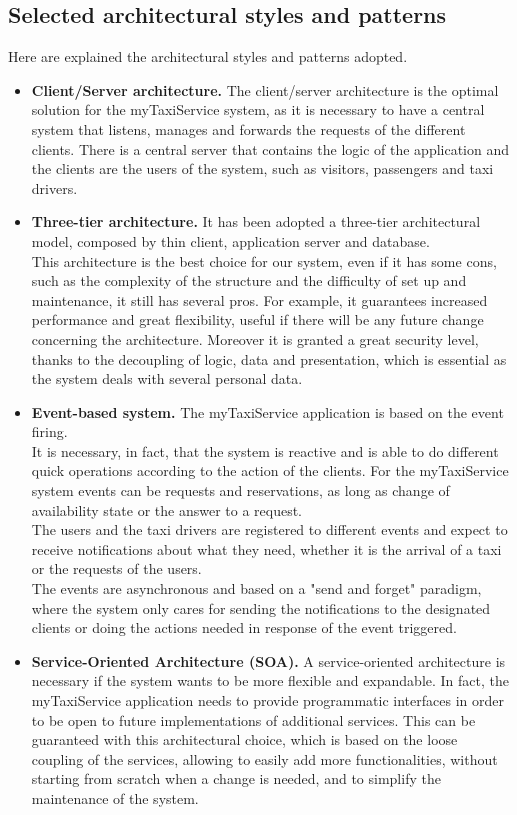 		\subsection{Selected architectural styles and patterns}
		Here are explained the architectural styles and patterns adopted.
		\begin{itemize}
			\item \textbf{Client/Server architecture.} The client/server architecture is the optimal solution for the myTaxiService system, as it is necessary to have a central system that listens, manages and forwards the requests of the different clients. There is a central server that contains the logic of the application and the clients are the users of the system, such as visitors, passengers and taxi drivers.
			\item \textbf{Three-tier architecture.} It has been adopted a three-tier architectural model, composed by thin client, application server and database.\\ This architecture is the best choice for our system, even if it has some cons, such as the complexity of the structure and the difficulty of set up and maintenance, it still has several pros. For example, it guarantees increased performance and great flexibility, useful if there will be any future change concerning the architecture. Moreover it is granted a great security level, thanks to the decoupling of logic, data and presentation, which is essential as the system deals with several personal data.
			\item \textbf{Event-based system.} The myTaxiService application is based on the event firing. \\It is necessary, in fact, that the system is reactive and is able to do different quick operations according to the action of the clients. For the myTaxiService system events can be requests and reservations, as long as change of availability state or the answer to a request. \\The users and the taxi drivers are registered to different events and expect to receive notifications about what they need, whether it is the arrival of a taxi or the requests of the users.\\ The events are asynchronous and based on a "send and forget" paradigm, where the system only cares for sending the notifications to the designated clients or doing the actions needed in response of the event triggered.
			\item  \textbf{Service-Oriented Architecture (SOA).} A service-oriented architecture is necessary if the system wants to be more flexible and expandable. In fact, the myTaxiService application needs to provide programmatic interfaces in order to be open to future implementations of additional services. This can be guaranteed with this architectural choice, which is based on the loose coupling of the services, allowing to easily add more functionalities, without starting from scratch when a change is needed, and to simplify the maintenance of the system.
		\end{itemize}
							
%